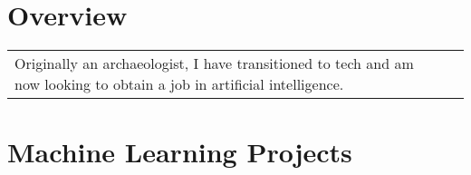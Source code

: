 \documentclass[letterpaper]{resume}
\begin{document}
\author{Sarah F. Majors}
\maketitle

\section{Overview}
\goodbreak\vspace{\secskip}\par\noindent\begin{tabularx}{\linewidth}{Xr}  
  Originally an archaeologist, I have transitioned to tech and am now looking to obtain a job in artificial intelligence.
\end{tabularx}


\section{Machine Learning Projects}
\end{document}
